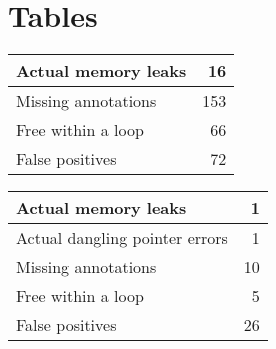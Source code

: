 \documentclass[12pt]{article}
\begin{document}
\section{Tables}

\centering 
\begin{tabular}{| l | r |}
    \hline 
    Actual memory leaks & 16 \\
    \hline
    Missing annotations & 153 \\
    \hline 
    Free within a loop & 66 \\
    \hline 
    False positives & 72 \\
    \hline 
\end{tabular}

\vspace{1in}

\centering 
\begin{tabular}{| l | r |}
    \hline 
    Actual memory leaks & 1 \\
    \hline 
    Actual dangling pointer errors & 1 \\
    \hline
    Missing annotations & 10 \\
    \hline 
    Free within a loop & 5 \\
    \hline 
    False positives & 26 \\
    \hline 
\end{tabular} 
\end{document}
